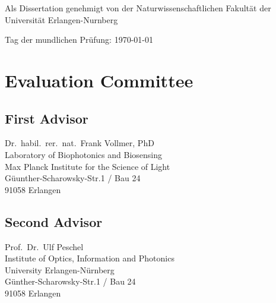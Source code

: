 Als Dissertation genehmigt von der Naturwissenschaftlichen Fakultät der
Universität Erlangen-Nurnberg\\
\vspace{0.5cm}

Tag der mundlichen Prüfung: \today\\
\vspace{0.5cm}

\section*{Evaluation Committee}
\subsection*{First Advisor}
Dr.~habil.~rer.~nat.~Frank Vollmer, PhD\\
Laboratory of Biophotonics and Biosensing\\
Max Planck Institute for the Science of Light\\
Güunther-Scharowsky-Str.1 / Bau 24\\
91058 Erlangen
\subsection*{Second Advisor}
Prof.~Dr.~Ulf Peschel\\
Institute of Optics, Information and Photonics\\
University Erlangen-Nürnberg\\
Günther-Scharowsky-Str.1 / Bau 24\\
91058 Erlangen

